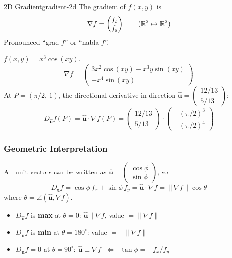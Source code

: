 \begin{definition}{2D Gradient}{gradient-2d}
  The gradient of $f(x,y)$ is
  \[
    \nabla f =
    \begin{pmatrix}
      f_{x} \\f_{y}
    \end{pmatrix}
    \qquad (\mathbb{R}^{2}\mapsto\mathbb{R}^{2})
  \]
  Pronounced ``grad $f$'' or ``nabla $f$''.
\end{definition}

\begin{example}
  $f(x,y)=x^{3}\cos(xy)$.
  \[
    \nabla f
    =
    \begin{pmatrix}
      3x^{2}\cos(xy)-x^{3}y\sin(xy) \\-x^{4}\sin(xy)
    \end{pmatrix}
  \]
  At $P=(\pi/2,\,1)$, the directional derivative in direction
  $\hat{\mathbf{u}}=
    \begin{pmatrix}
      12/13 \\5/13
    \end{pmatrix}
  $:
  \[
    D_{\hat{\mathbf{u}}}f(P) = \hat{\mathbf{u}}\cdot\nabla f(P)
    =
    \begin{pmatrix}
      12/13 \\5/13
    \end{pmatrix}
    \cdot
    \begin{pmatrix}
      -(\pi/2)^{3} \\-(\pi/2)^{4}
    \end{pmatrix}
  \]
\end{example}

\subsubsection{Geometric Interpretation}

All unit vectors can be written as
$\hat{\mathbf{u}}=
  \begin{pmatrix}
    \cos\phi \\\sin\phi
  \end{pmatrix}
$, so
\[
  D_{\hat{\mathbf{u}}}f = \cos\phi\,f_{x}+\sin\phi\,f_{y}
  = \hat{\mathbf{u}}\cdot\nabla f
  = \lVert\nabla f\rVert\cos\theta
\]
where $\theta=\angle(\hat{\mathbf{u}},\nabla f)$.

\begin{itemize}
  \item $D_{\hat{\mathbf{u}}}f$ is \textbf{max} at $\theta=0$:
        $\hat{\mathbf{u}}\parallel\nabla f$,
        value $=\lVert\nabla f\rVert$
  \item $D_{\hat{\mathbf{u}}}f$ is \textbf{min} at $\theta=180^{\circ}$:
        value $=-\lVert\nabla f\rVert$
  \item $D_{\hat{\mathbf{u}}}f=0$ at $\theta=90^{\circ}$:
        $\hat{\mathbf{u}}\perp\nabla f$
        $\;\Longleftrightarrow\;$
        $\tan\phi=-f_{x}/f_{y}$
\end{itemize}

